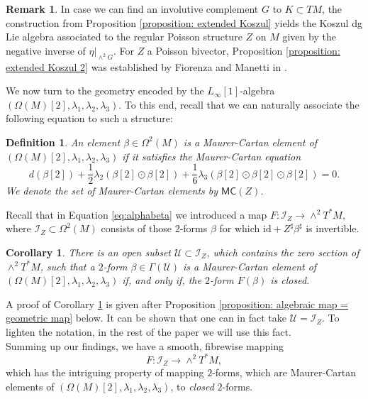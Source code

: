 \documentclass[11pt,thmsa]{amsart}
\newtheorem{corollary}[theorem]{Corollary}
\newtheorem{definition}[theorem]{Definition}
\theoremstyle{definition}
\newtheorem{remark}[theorem]{Remark}
\newcommand{\MC}{\mathsf{MC}}
\newcommand{\lione}{$L_{\infty}[1]$-algebra }
\begin{document}
{\begin{remark}
In case we can find an involutive complement $G$ to $K\subset TM$,
 the construction from 
Proposition \ref{proposition: extended Koszul}
yields the Koszul dg Lie algebra
associated to the regular Poisson structure $Z$ on $M$ given by
the negative inverse of $\eta\vert_{\wedge^2 G}$.
For $Z$ a Poisson bivector, Proposition \ref{proposition: extended Koszul 2} was established by Fiorenza and Manetti in \cite{Fiorenza-Manetti}.
\end{remark}


We now turn to the geometry encoded by the
\lione
$(\Omega(M)[2],\lambda_1,\lambda_2,\lambda_3)$.
To this end, recall that we can naturally associate the following equation to such a structure:

\begin{definition}\label{definition: Maurer-Cartan equation}
An element $\beta \in \Omega^2(M)$ is a {\em Maurer-Cartan element} 
of $(\Omega(M)[2],\lambda_1,\lambda_2,\lambda_3)$ if it satisfies the {\em Maurer-Cartan equation}
$$ d(\beta[2]) + \frac{1}{2}\lambda_2(\beta[2]\odot \beta[2]) + \frac{1}{6}\lambda_3(\beta[2]\odot \beta[2]\odot \beta[2])=0.$$
We denote the set of Maurer-Cartan elements by $\MC(Z)$.
\end{definition}

Recall that in Equation \eqref{eq:alphabeta} we introduced a map
 $F \colon \mathcal{I}_Z\to \wedge^2 T^*M$, 
where  $\mathcal{I}_Z \subset \Omega^2(M)$  consists of those 2-forms $\beta$
for which $\mathrm{id} + Z^\sharp \beta^\sharp$ is invertible. 

\begin{corollary}\label{corollary: MC for bivector fields}
There is an open subset $\mathcal{U}\subset \mathcal{I}_Z$, which contains the zero section of $\wedge^2 T^*M$, such that
a $2$-form $\beta \in \Gamma(\mathcal{U})$ is a Maurer-Cartan element of $(\Omega(M)[2],\lambda_1,\lambda_2,\lambda_3)$ if, and only if, the $2$-form $F(\beta)$
is closed.
\end{corollary}

A proof of Corollary \ref{corollary: MC for bivector fields} is given after Proposition \ref{proposition: algebraic map = geometric map} below.
{It can be shown {\cite{SZDirac}} that one} can in fact take $\mathcal{U}=\mathcal{I}_Z$. To lighten the notation, in the rest of the paper we will use this fact. \\


Summing up our findings, we have a smooth, fibrewise mapping 
$$ F: \mathcal{I}_Z \to \wedge^2 T^*M,$$ which has the intriguing property of mapping $2$-forms, which are Maurer-Cartan elements of $(\Omega(M)[2],\lambda_1,\lambda_2,\lambda_3)$, to {\em closed} $2$-forms.

}
\end{document}
